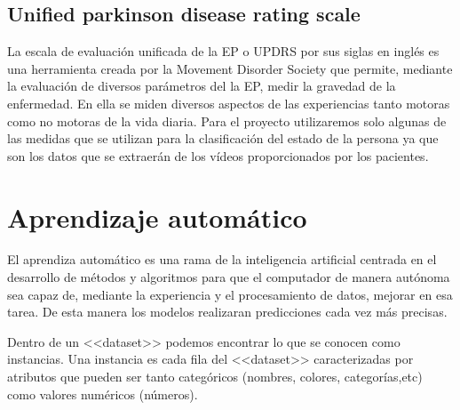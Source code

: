 \subsection{Unified parkinson disease rating scale}

La escala de evaluación unificada de la EP o UPDRS por sus siglas en inglés es una herramienta creada por la Movement Disorder Society que permite, mediante la evaluación de diversos parámetros del la EP, medir la gravedad de la enfermedad. En ella se miden diversos aspectos de las experiencias tanto motoras como no motoras de la vida diaria. Para el proyecto utilizaremos solo algunas de las medidas que se utilizan para la clasificación del estado de la persona ya que son los datos que se extraerán de los vídeos proporcionados por los pacientes.


\section{Aprendizaje automático}

El aprendiza automático es una rama de la inteligencia artificial centrada en el desarrollo de métodos y algoritmos para que el computador de manera autónoma sea capaz de, mediante la experiencia y el procesamiento de datos, mejorar en esa tarea. De esta manera los modelos realizaran predicciones cada vez más precisas.

Dentro de un <<dataset>> podemos encontrar lo que se conocen como instancias. Una instancia es cada fila del <<dataset>> caracterizadas por atributos que pueden ser tanto categóricos (nombres, colores, categorías,etc) como valores numéricos (números).

